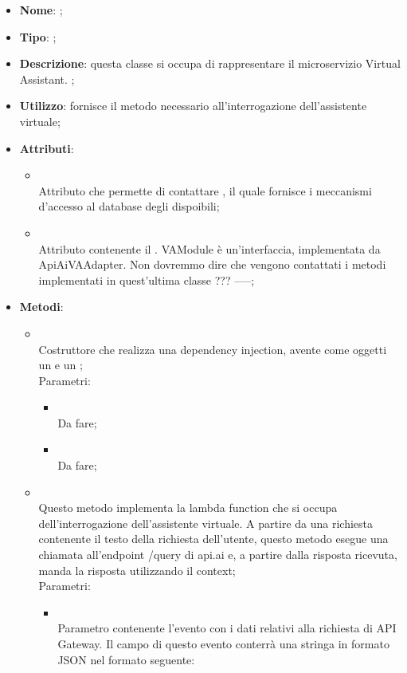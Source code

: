 \begin{itemize}
	\item \textbf{Nome}: ;
	\item \textbf{Tipo}: ;
	\item \textbf{Descrizione}: questa classe si occupa di rappresentare il microservizio Virtual Assistant. ;
	\item \textbf{Utilizzo}: fornisce il metodo necessario all'interrogazione dell'assistente virtuale;
	\item \textbf{Attributi}:
	\begin{itemize}
		\item[]  \\
		Attributo che permette di contattare , il quale fornisce i meccanismi d'accesso al database degli  dispoibili;
		\item[]  \\
		Attributo contenente il .
VAModule è un'interfaccia, implementata da ApiAiVAAdapter. Non dovremmo dire che vengono contattati i metodi implementati in quest'ultima classe ???
-----;
	\end{itemize}
	\item \textbf{Metodi}:
	\begin{itemize}
		\item[]  \\
		Costruttore che realizza una dependency injection, avente come oggetti un  e un ;\\
		Parametri:
		\begin{itemize}
			\item {} \\
			Da fare;
			\item {} \\
			Da fare;
		\end{itemize}
		\item[]  \\
		Questo metodo implementa la lambda function che si occupa dell'interrogazione dell'assistente virtuale. A partire da una richiesta contenente il testo della richiesta dell'utente, questo metodo esegue una chiamata all'endpoint /query di api.ai e, a partire dalla risposta ricevuta, manda la risposta utilizzando il context;\\
		Parametri:
		\begin{itemize}
			\item {} \\
			Parametro contenente l'evento con i dati relativi alla richiesta di API Gateway. Il campo  di questo evento conterrà una stringa in formato JSON nel formato seguente:


\end{itemize}
\end{itemize}
\end{itemize}
